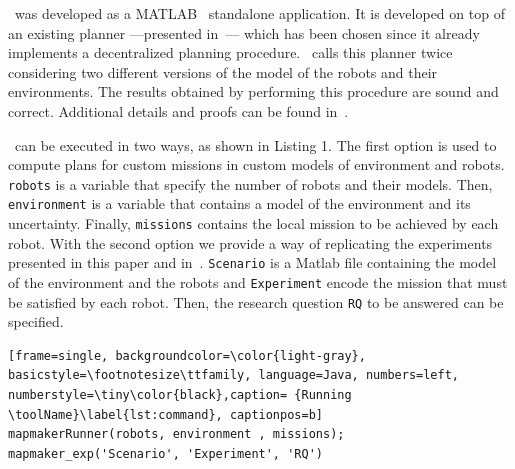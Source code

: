
\toolName\  was developed as a  MATLAB~\cite{matlab} standalone application.
It is developed on top of an existing planner ---presented in~\cite{tumova2016multi}--- which has been chosen since it already implements a decentralized planning procedure.
\toolName\ calls this planner twice considering two different versions of the model of the robots and their environments. 
The results obtained by performing this procedure are sound and correct.
Additional details and proofs can be found in~\cite{mapmaker17}.


\toolName\ can be executed in two ways, as shown in Listing 1.
The first option is used to compute plans for custom missions in custom models of environment and robots.
\texttt{robots} is a variable that specify the number of robots and their models.
Then, \texttt{environment} is a variable that contains a model of the environment and its uncertainty.
Finally, \texttt{missions} contains the local mission to be achieved by each robot.
With the second option we provide a way of replicating the experiments presented in this paper and in~\cite{mapmaker17}.
\texttt{Scenario} is a Matlab file containing the model of the environment and the robots and \texttt{Experiment} encode the mission that must be satisfied by each robot.
Then, the research question \texttt{RQ} to be answered can be specified.



\begin{lstlisting}[frame=single, backgroundcolor=\color{light-gray}, basicstyle=\footnotesize\ttfamily, language=Java, numbers=left, numberstyle=\tiny\color{black},caption= {Running \toolName}\label{lst:command}, captionpos=b]
mapmakerRunner(robots, environment , missions);
mapmaker_exp('Scenario', 'Experiment', 'RQ')
\end{lstlisting}







